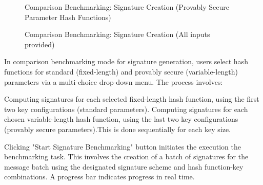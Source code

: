 \documentclass[]{final_report}
\begin{document}
\begin{figure}[H]
\begin{minipage}{0.49\textwidth}
       \caption{Comparison Benchmarking: Signature Creation (Provably Secure Parameter Hash Functions)}
        \label{fig:image2}
    \end{minipage}
      \begin{minipage}{0.55\textwidth}
        \centering
       \caption{Comparison Benchmarking: Signature Creation (All inputs provided)}
        \label{fig:image2}
    \end{minipage}
\end{figure}

In comparison benchmarking mode for signature generation, users select hash functions for standard (fixed-length) and provably secure (variable-length) parameters via a multi-choice drop-down menu. The process involves:

Computing signatures for each selected fixed-length hash function, using the first two key configurations (standard parameters).
Computing signatures for each chosen variable-length hash function, using the last two key configurations (provably secure parameters).This is done sequentially for each key size.

Clicking "Start Signature Benchmarking" button initiates the execution the benchmarking task. This involves the creation of a batch of signatures for the message batch using the designated signature scheme and hash function-key combinations. A progress bar indicates progress in real time.
\end{document}
